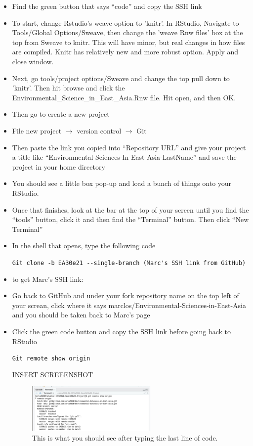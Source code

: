 \documentclass[12pt]{../SOP4_alpha}
\begin{document}
\begin{itemize}
  \item Find the green button that says “code” and copy the SSH link
  \item To start, change Rstudio's weave option to 'knitr'. In RStudio, Navigate to Tools/Global Options/Sweave, then change the 'weave Rnw files' box at the top from Sweave to knitr. This will have minor, but real changes in how files are compiled. Knitr has relatively new and more robust option. Apply and close window. 
  \item Next, go tools/project options/Sweave and change the top pull down to 'knitr'. Then hit browse and click the Environmental_Science_in_East_Asia.Rnw file. Hit open, and then OK.
  \item Then go to create a new project
  \item File new project $\rightarrow$ version control $\rightarrow$ Git
  \item Then paste the link you copied into ``Repository URL'' and give your project a title like ``Environmental-Sciences-In-East-Asia-LastName'' and save the project in your home directory
    \item You should see a little box pop-up and load a bunch of things onto your RStudio. 
  \item Once that finishes, look at the bar at the top of your screen until you find the ``tools'' button, click it and then find the ``Terminal'' button. Then click ``New Terminal''
  \item In the shell that opens, type the following code

    \indent\verb"Git clone -b EA30e21 --single-branch (Marc's SSH link from GitHub)"
    
      \item to get Marc's SSH link:
        \item Go back to GitHub and under your fork repository name on the top left of your screan, click where it says marclos/Environmental-Sciences-in-East-Asia and you should be taken back to Marc’s page
        \item Click the green code button and copy the SSH link before going back to RStudio
        
    \indent\verb"Git remote show origin"
  
  INSERT SCREEENSHOT
  
\begin{figure}
\centering
\includegraphics[width=0.6\textwidth]{graphics/terminal_output.jpg}
\caption{This is what you should see after typing the last line of code.}
\end{figure}


\end{itemize}
\end{document}
